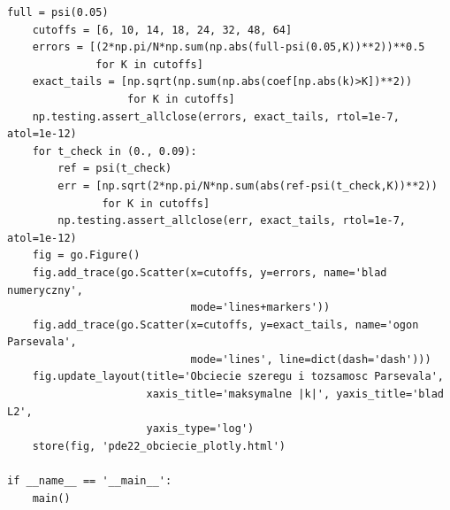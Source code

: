\begin{lstlisting}[style=pythonpde,caption={Ewolucja Schrodingera: pakiet, faza i błąd widmowy (Plotly)},label={code:pde22-plotly}]
    full = psi(0.05)
    cutoffs = [6, 10, 14, 18, 24, 32, 48, 64]
    errors = [(2*np.pi/N*np.sum(np.abs(full-psi(0.05,K))**2))**0.5
              for K in cutoffs]
    exact_tails = [np.sqrt(np.sum(np.abs(coef[np.abs(k)>K])**2))
                   for K in cutoffs]
    np.testing.assert_allclose(errors, exact_tails, rtol=1e-7, atol=1e-12)
    for t_check in (0., 0.09):
        ref = psi(t_check)
        err = [np.sqrt(2*np.pi/N*np.sum(abs(ref-psi(t_check,K))**2))
               for K in cutoffs]
        np.testing.assert_allclose(err, exact_tails, rtol=1e-7, atol=1e-12)
    fig = go.Figure()
    fig.add_trace(go.Scatter(x=cutoffs, y=errors, name='blad numeryczny',
                             mode='lines+markers'))
    fig.add_trace(go.Scatter(x=cutoffs, y=exact_tails, name='ogon Parsevala',
                             mode='lines', line=dict(dash='dash')))
    fig.update_layout(title='Obciecie szeregu i tozsamosc Parsevala',
                      xaxis_title='maksymalne |k|', yaxis_title='blad L2',
                      yaxis_type='log')
    store(fig, 'pde22_obciecie_plotly.html')

if __name__ == '__main__':
    main()
\end{lstlisting}



